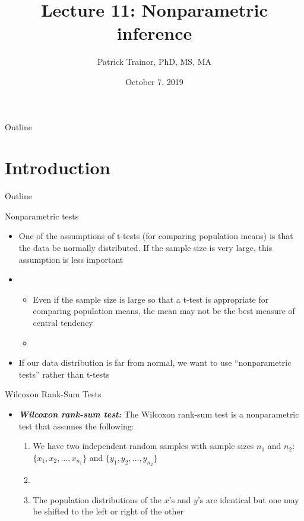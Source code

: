 \documentclass[xcolor=dvipsnames]{beamer}
\title[Lecture 11]{Lecture 11: Nonparametric inference}
\author[Patrick Trainor]{Patrick Trainor, PhD, MS, MA}
\institute[NMSU]{New Mexico State University}
\date{October 7, 2019}
\begin{document}
\begin{frame}
\maketitle
\end{frame}

\begin{frame}{Outline}
\tableofcontents[hideallsubsections]
\end{frame}

\section{Introduction}
\begin{frame}{Outline}
\tableofcontents[currentsection,subsectionstyle=show/shaded/hide]
\end{frame}

\begin{frame}{Nonparametric tests}
	\begin{itemize}
		\item One of the assumptions of t-tests (for comparing population means) is that the data be normally distributed. If the sample size is very large, this assumption is less important \pause
		\item[]
		\begin{itemize}
			\item Even if the sample size is large so that a t-test is appropriate for comparing population means, the mean may not be the best measure of central tendency \pause
			\item[]
		\end{itemize}
		\item If our data distribution is far from normal, we want to use ``nonparametric tests'' rather than t-tests 
	\end{itemize}
\end{frame}

\begin{frame}{Wilcoxon Rank-Sum Tests}
	\begin{itemize}
		\item \textbf{\emph{Wilcoxon rank-sum test:}} The Wilcoxon rank-sum test is a nonparametric test that assumes the following:  \pause
		
		\begin{enumerate}
			\item We have two independent random samples with sample sizes $n_1$ and $n_2$: $\{x_1, x_2, \hdots, x_{n_1}\}$ and $\{y_1, y_2, \hdots, y_{n_2}\}$ \pause
			\item[]
			\item The population distributions of the $x$'s and $y$'s are identical but one may be shifted to the left or right of the other
		\end{enumerate}
	\end{itemize}
\end{frame}
\end{document}
